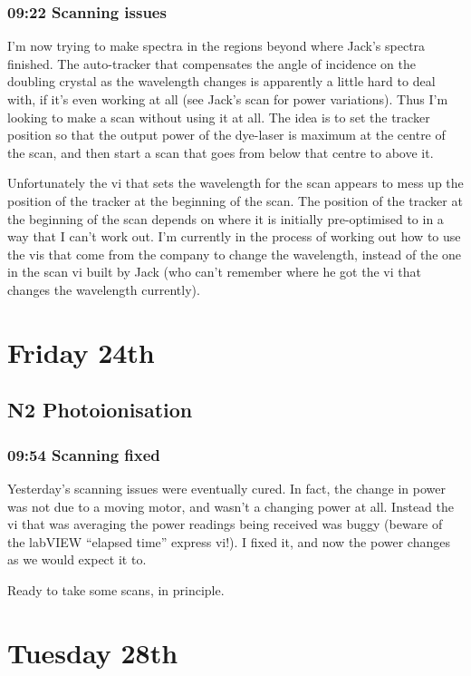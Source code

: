 \documentclass[11pt]{article}
\begin{document}
\subsubsection*{09:22 Scanning issues}
\label{sec-10-1-2}

I'm now trying to make spectra in the regions beyond where Jack's
spectra finished. The auto-tracker that compensates the angle of
incidence on the doubling crystal as the wavelength changes is
apparently a little hard to deal with, if it's even working at all
(see Jack's scan for power variations). Thus I'm looking to make a
scan without using it at all. The idea is to set the tracker position
so that the output power of the dye-laser is maximum at the centre of
the scan, and then start a scan that goes from below that centre to
above it. 

Unfortunately the vi that sets the wavelength for the scan appears to
mess up the position of the tracker at the beginning of the scan. The
position of the tracker at the beginning of the scan depends on where
it is initially pre-optimised to in a way that I can't work out. I'm
currently in the process of working out how to use the vis that come
from the company to change the wavelength, instead of the one in the
scan vi built by Jack (who can't remember where he got the vi that
changes the wavelength currently). 
\section*{Friday 24th}
\label{sec-11}
\subsection*{N2 Photoionisation}
\label{sec-11-1}
\subsubsection*{09:54 Scanning fixed}
\label{sec-11-1-1}

Yesterday's scanning issues were eventually cured. In fact, the change
in power was not due to a moving motor, and wasn't a changing power at
all. Instead the vi that was averaging the power readings being
received was buggy (beware of the labVIEW ``elapsed time'' express
vi!). I fixed it, and now the power changes as we would expect it to.

Ready to take some scans, in principle.
\section*{Tuesday 28th}
\label{sec-12}
\end{document}

